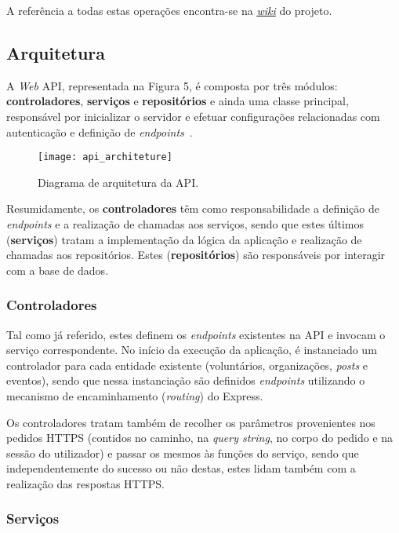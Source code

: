 A referência a todas estas operações encontra-se na \href{https://github.com/leomartins1999/PS1920-G46/wiki}{\textit{wiki}} do projeto.

\subsection{Arquitetura}

A \textit{Web} API, representada na Figura 5, é composta por três módulos: \textbf{controladores}, \textbf{serviços} e \textbf{repositórios} e ainda uma classe principal, responsável por inicializar o servidor e efetuar configurações relacionadas com autenticação e definição de \textit{endpoints}~\cite{Lauret2019,Block2014}.

\begin{figure}[h]
	\centering
	\texttt{[image: api\_architeture]}
	\caption{Diagrama de arquitetura da API.}
\end{figure}

Resumidamente, os \textbf{controladores} têm como responsabilidade a definição de \textit{endpoints} e a realização de chamadas aos serviços, sendo que estes últimos (\textbf{serviços}) tratam a implementação da lógica da aplicação e realização de chamadas aos repositórios. Estes (\textbf{repositórios}) são responsáveis por interagir com a base de dados.

\subsubsection{Controladores}

Tal como já referido, estes definem os \textit{endpoints} existentes na API e invocam o serviço correspondente. No início da execução da aplicação, é instanciado um controlador para cada entidade existente (voluntários, organizações, \textit{posts} e eventos), sendo que nessa instanciação são definidos \textit{endpoints} utilizando o mecanismo de encaminhamento (\textit{routing}) do Express.

\medskip \par

Os controladores tratam também de recolher os parâmetros provenientes nos pedidos HTTPS (contidos no caminho, na \textit{query string}, no corpo do pedido e na sessão do utilizador) e passar os mesmos às funções do serviço, sendo que independentemente do sucesso ou não destas, estes lidam também com a realização das respostas HTTPS.

\subsubsection{Serviços}

